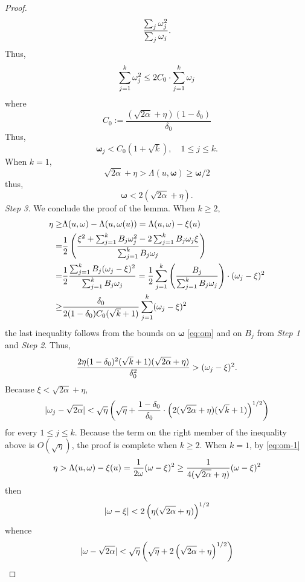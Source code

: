 \documentclass[a4paper,12pt,oneside]{amsart}
\theoremstyle{definition}
\theoremstyle{remark}
\theoremstyle{theorem}
\begin{document}
\begin{proof}
\[\frac{\sum_j {\mathbf{\omega}}_j \sp 2}{\sum_j {\mathbf{\omega}}_j}.
\]
Thus,
\[
\sum_{j = 1}\sp k{\mathbf{\omega}}_j \sp 2\leq 2 C_0
\cdot\sum_{j = 1} \sp k {\mathbf{\omega}}_j
\]
where
\[
C_0 := \frac{(\sqrt{2\alpha} + \eta)(1 - \delta_0)}{\delta_0}
\]
Thus,
\begin{equation}
\label{eq:om}
{\mathbf{\omega}}_j < C_0 (1 + \sqrt{k}),\quad 1\leq j\leq k.
\end{equation}
When $ k = 1 $,
\[
\sqrt{2\alpha} + \eta > \Lambda(u,{\mathbf{\omega}})\geq{\mathbf{\omega}}/2 
\]
thus,
\begin{equation}
\label{eq:om-1}
{\mathbf{\omega}} < 2(\sqrt{2\alpha} + \eta).
\end{equation}
\textsl{Step 3.}
We conclude the proof of the lemma. When $ k\geq 2 $,
\[
\begin{split}
\eta \geq &\Lambda(u,{\mathbf{\omega}}) - \Lambda(u,{\mathbf{\omega}}(u)) = \Lambda(u,{\mathbf{\omega}}) - \xi(u) \\
=& \frac{1}{2}
\left(\frac{\xi\sp 2 + \sum_{j = 1} \sp k B_j {\mathbf{\omega}}_j \sp 2 - 2
\sum_{j = 1}\sp k B_j {\mathbf{\omega}}_j \xi}{\sum_{j = 1}\sp k B_j {\mathbf{\omega}}_j}\right)\\
=& \frac{1}{2}\frac{\sum_{j = 1} \sp k B_j ({\mathbf{\omega}}_j - \xi)\sp 2}{\sum_{j = 1}\sp k B_j {\mathbf{\omega}}_j} 
= \frac{1}{2}
\sum_{j = 1} \sp k \left(\frac{B_j}{\sum_{j = 1}\sp k B_j {\mathbf{\omega}}_j}\right)\cdot
({\mathbf{\omega}}_j - \xi)\sp 2\\
\geq&\frac{\delta_0}{2(1 - \delta_0) C_0 (\sqrt{k} + 1)}
\sum_{j = 1} \sp k ({\mathbf{\omega}}_j - \xi)\sp 2
\end{split}
\]
the last inequality follows from the bounds on 
$ {\mathbf{\omega}} $ \eqref{eq:om} and on $ B_j $ from \textsl{Step 1}
and \textsl{Step 2}. Thus,
\[
\frac{2\eta (1 - \delta_0)\sp 2 (\sqrt{k} + 1)(\sqrt{2\alpha} + \eta)}{\delta_0 \sp 2} > 
({\mathbf{\omega}}_j - \xi)\sp 2.
\]
Because $ \xi < \sqrt{2\alpha} + \eta $, 
\begin{equation}
\label{eq:Bj-4}
|{\mathbf{\omega}}_j - \sqrt{2\alpha}| < \sqrt{\eta} \left(\sqrt{\eta} + 
\frac{1 - \delta_0}{\delta_0}\cdot
\left(2(\sqrt{2\alpha} + \eta)(\sqrt{k} + 1)\right)\sp{1/2}\right)
\end{equation}
for every $ 1\leq j\leq k $.
Because the term on the right member of the inequality above is
$ O(\sqrt{\eta}) $, the proof is complete when $ k\geq 2 $.
When $ k = 1 $, by \eqref{eq:om-1}
\[
\eta > \Lambda(u,{\mathbf{\omega}}) - \xi(u) = \frac{1}{2{\mathbf{\omega}}} ({\mathbf{\omega}} - \xi)\sp 2\geq
\frac{1}{4(\sqrt{2\alpha} + \eta)} ({\mathbf{\omega}} - \xi)\sp 2
\]
then
\[
|{\mathbf{\omega}} - \xi| < 2\left(\eta(\sqrt{2\alpha} + \eta)\right)\sp{1/2}
\]
whence
\begin{equation}
\label{eq:Bj-5}
|{\mathbf{\omega}} - \sqrt{2\alpha}| < \sqrt{\eta}\left(\sqrt{\eta} + 
2\left(\sqrt{2\alpha} + \eta\right)\sp{1/2} \right)
\end{equation}
\end{proof}
\end{document}
